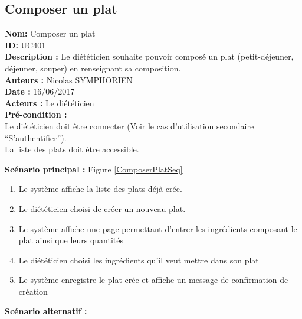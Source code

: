 \subsection{Composer un plat}

\noindent \textbf{Nom:} Composer un plat \\
\textbf{ID:} UC401\\
\textbf{Description :} Le diététicien souhaite pouvoir composé un plat (petit-déjeuner, déjeuner, souper) en renseignant sa composition.\\
\textbf{Auteurs :} Nicolas SYMPHORIEN\\
\textbf{Date :} 16/06/2017 \\
\textbf{Acteurs :} Le diététicien \\
\textbf{Pré-condition :} \\
Le diététicien doit être connecter (Voir le cas d'utilisation secondaire ``S'authentifier''). \\
La liste des plats doit être accessible.

\noindent \textbf{Scénario principal : } Figure \ref{ComposerPlatSeq}

\begin{enumerate}
	\item \label{UC401_step1}Le système affiche la liste des plats déjà crée.
	\item \label{UC401_step2}Le diététicien choisi de créer un nouveau plat.
	\item Le système affiche une page permettant d'entrer les ingrédients composant le plat ainsi que leurs quantités
	\item Le diététicien choisi les ingrédients qu'il veut mettre dans son plat
	\item Le système enregistre le plat crée et affiche un message de confirmation de création
\end{enumerate}

 \noindent \textbf{Scénario alternatif :}

